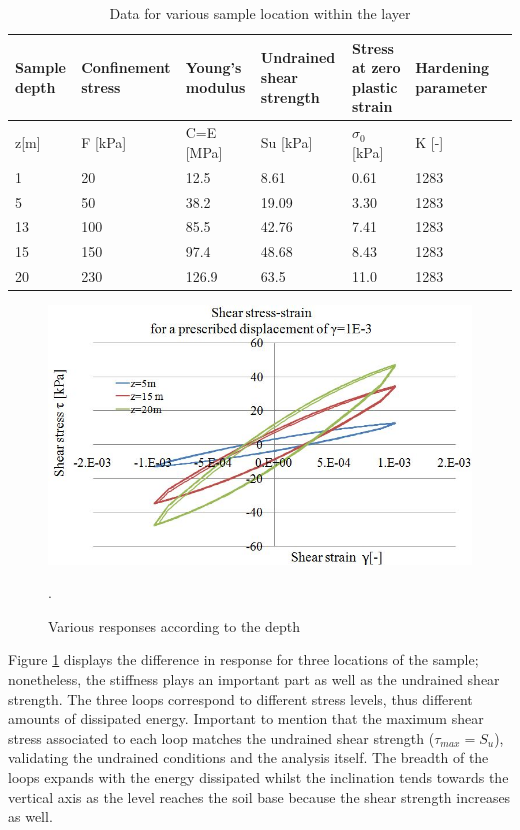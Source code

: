 \documentclass[12pt,a4paper]{report}
\begin{document}
\begin{table}[h!]
	\centering
	\begin{tabular}{|p{2cm}|p{2cm}|p{2cm}| p{3cm}|p{2cm}|p{2cm}|p{2cm}|}
		\hline Sample depth &Confinement stress & Young's modulus  & Undrained shear strength &  Stress at zero plastic strain & Hardening parameter\\
		\hline  z[m]  & F [kPa]  & C=E [MPa] & Su [kPa] & $\sigma_0$ [kPa]  & K [-] \\
		\hline 1    & 20 & 12.5 & 8.61 & 0.61 &  1283 \\ 
		\hline 5  & 50  &  38.2 & 19.09 & 3.30  & 1283\\ 
		\hline 13  &  100  &  85.5  & 42.76 & 7.41  &  1283\\ 
		\hline 15 &  150  &  97.4  & 48.68 & 8.43  & 1283\\ 
		\hline 20 &  230  &    126.9  & 63.5 &  11.0  & 1283 \\ 
		\hline
	\end{tabular}
	\caption{Data for various sample location within the layer}
	\label{Table2}
\end{table}

\begin{figure}[h!]
	\centering
	\includegraphics[width=0.8\linewidth]{"oneElem1"}
	\caption{Various responses according to the depth}
	\label{loops2}.
\end{figure}

Figure \ref{loops2} displays the difference in response for three locations of the sample; nonetheless, the stiffness plays an important part as well as the undrained shear strength. The three loops correspond to different stress levels, thus different amounts of dissipated energy. Important to mention that the maximum shear stress associated to each loop matches the undrained shear strength ($\tau_{max} =S_u$), validating the undrained conditions and the analysis itself. The breadth of the loops expands with the energy dissipated whilst the inclination tends towards the vertical axis as the level reaches the soil base because the shear strength increases as well. 
\end{document}
